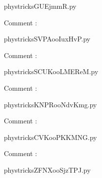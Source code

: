     \newcommand{\CaptionFigGUEjmmR}{<+Type your caption here+>}
    \begin{center}
        
    \end{center}
    phystricksGUEjmmR.py

    Comment : 

    \clearpage
    


    \newcommand{\CaptionFigSVPAooIuxHvP}{<+Type your caption here+>}
    \begin{center}
        
    \end{center}
    phystricksSVPAooIuxHvP.py

    Comment : 

    \clearpage
    


    \newcommand{\CaptionFigSCUKooLMEReM}{<+Type your caption here+>}
    \begin{center}
        
    \end{center}
    phystricksSCUKooLMEReM.py

    Comment : 

    \clearpage
    


    \newcommand{\CaptionFigKNPRooNdvKmg}{<+Type your caption here+>}
    \begin{center}
        
    \end{center}
    phystricksKNPRooNdvKmg.py

    Comment : 

    \clearpage
    


    \newcommand{\CaptionFigCVKooPKKMNG}{<+Type your caption here+>}
    \begin{center}
        
    \end{center}
    phystricksCVKooPKKMNG.py

    Comment : 

    \clearpage
    


    \newcommand{\CaptionFigZFNXooSjzTPJ}{<+Type your caption here+>}
    \begin{center}
        
    \end{center}
    phystricksZFNXooSjzTPJ.py

